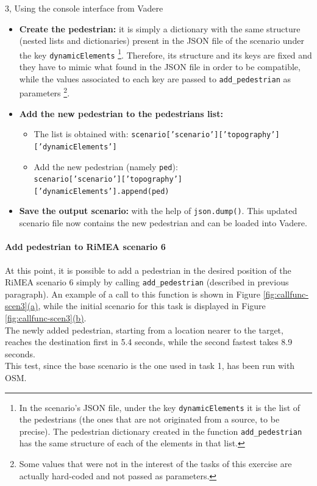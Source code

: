\documentclass[10pt,a4paper]{article}
\begin{document}
\begin{task}{3, Using the console interface from Vadere}
\begin{itemize}
    \item \textbf{Create the pedestrian:}
    it is simply a dictionary with the same structure (nested lists and dictionaries) present in the JSON file of the scenario under the key \texttt{dynamicElements}
    \footnote{In the scenario's JSON file, under the key \texttt{dynamicElements} it is the list of the pedestrians (the ones that are not originated from a source, to be precise).
    The pedestrian dictionary created in the function \texttt{add\_pedestrian} has the same structure of each of the elements in that list.}.
    Therefore, its structure and its keys are fixed and they have to mimic what found in the JSON file in order to be compatible, while the values associated to each key are passed to \texttt{add\_pedestrian} as parameters
    \footnote{Some values that were not in the interest of the tasks of this exercise are actually hard-coded and not passed as parameters.}.
    
    \item \textbf{Add the new pedestrian to the pedestrians list:}
    \begin{itemize}
        \item The list is obtained with: \texttt{scenario['scenario']['topography']['dynamicElements']}
        
        \item Add the new pedestrian (namely \texttt{ped}):\\ \texttt{scenario['scenario']['topography']['dynamicElements'].append(ped)}
    \end{itemize}
    
    \item \textbf{Save the output scenario:}
    with the help of \texttt{json.dump()}.
    This updated scenario file now contains the new pedestrian and can be loaded into Vadere.
\end{itemize}

\paragraph{Add pedestrian to RiMEA scenario 6}
At this point, it is possible to add a pedestrian in the desired position of the RiMEA scenario 6 simply by calling \texttt{add\_pedestrian} (described in previous paragraph).
An example of a call to this function is shown in Figure \hyperref[fig:callfunc-scen3]{\ref{fig:callfunc-scen3}(a)}, while the initial scenario for this task is displayed in Figure \hyperref[fig:callfunc-scen3]{\ref{fig:callfunc-scen3}(b)}.\\
The newly added pedestrian, starting from a location nearer to the target, reaches the destination first in 5.4 seconds, while the second fastest takes 8.9 seconds.\\
This test, since the base scenario is the one used in task 1, has been run with OSM.


\end{task}
\end{document}
